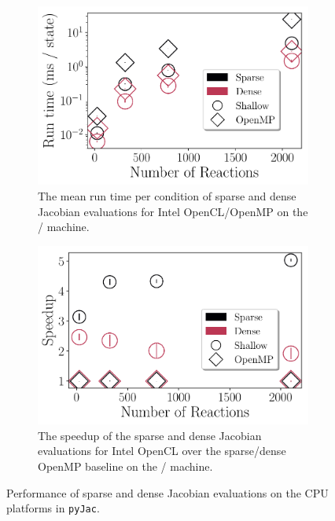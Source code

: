 \documentclass[12pt,number,sort&compress,preprint]{elsarticle}
\begin{document}
\begin{figure}[htbp]
\begin{subfigure}[t]{0.48\linewidth}
      \includegraphics[width=\textwidth]{sparse_vs_dense_sse.pdf}
      \caption{The mean run time per condition of sparse and dense Jacobian evaluations for Intel OpenCL\slash OpenMP on the \sse/ machine.}
      \label{F:sparse_vs_dense_sse}
  \end{subfigure}
  \hfill
  \begin{subfigure}[t]{0.48\linewidth}
      \includegraphics[width=\textwidth]{sparse_vs_dense_see_speedup.pdf}
      \caption{The speedup of the sparse and dense Jacobian evaluations for Intel OpenCL over the sparse\slash dense OpenMP baseline on the \sse/ machine.}
      \label{F:sparse_vs_dense_sse_speedup}
  \end{subfigure}
  \caption{Performance of sparse and dense Jacobian evaluations on the CPU platforms in \texttt{pyJac}.}
  \label{F:jacobian_perfomance}
\end{figure}
\end{document}
